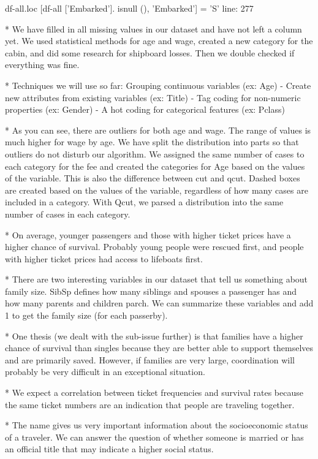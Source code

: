 \documentclass[onecolumn]{article}
\begin{document}
df-all.loc [df-all ['Embarked']. isnull (), 'Embarked'] = 'S' line: 277

* We have filled in all missing values in our dataset and have not left a column yet. We used statistical methods for age and wage, created a new category for the cabin, and did some research for shipboard losses. Then we double checked if everything was fine.

* Techniques we will use so far:
Grouping continuous variables (ex: Age)
- Create new attributes from existing variables (ex: Title)
- Tag coding for non-numeric properties (ex: Gender)
- A hot coding for categorical features (ex: Pclass)


* As you can see, there are outliers for both age and wage. The range of values ​​is much higher for wage by age. We have split the distribution into parts so that outliers do not disturb our algorithm. We assigned the same number of cases to each category for the fee and created the categories for Age based on the values ​​of the variable. This is also the difference between cut and qcut. Dashed boxes are created based on the values ​​of the variable, regardless of how many cases are included in a category. With Qcut, we parsed a distribution into the same number of cases in each category.

* On average, younger passengers and those with higher ticket prices have a higher chance of survival. Probably young people were rescued first, and people with higher ticket prices had access to lifeboats first.


* There are two interesting variables in our dataset that tell us something about family size. SibSp defines how many siblings and spouses a passenger has and how many parents and children parch. We can summarize these variables and add 1 to get the family size (for each passerby).

* One thesis (we dealt with the sub-issue further) is that families have a higher chance of survival than singles because they are better able to support themselves and are primarily saved. However, if families are very large, coordination will probably be very difficult in an exceptional situation.

* We expect a correlation between ticket frequencies and survival rates because the same ticket numbers are an indication that people are traveling together.

* The name gives us very important information about the socioeconomic status of a traveler. We can answer the question of whether someone is married or has an official title that may indicate a higher social status.
\end{document}
